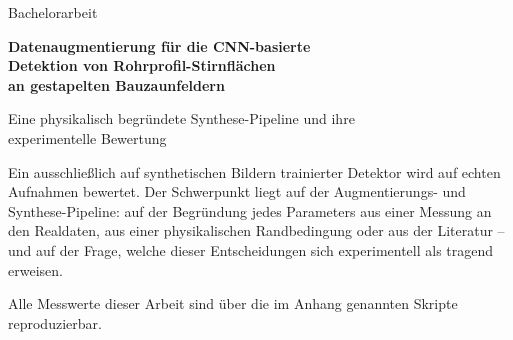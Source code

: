 \begin{titlepage}
\centering
\vspace*{2.5cm}

{\large Bachelorarbeit\par}
\vspace{1.6cm}

{\LARGE\bfseries Datenaugmentierung für die CNN-basierte\\[0.3em]
Detektion von Rohrprofil-Stirnflächen\\[0.3em]
an gestapelten Bauzaunfeldern\par}

\vspace{0.9cm}
{\large Eine physikalisch begründete Synthese-Pipeline und ihre\\
experimentelle Bewertung\par}

\vspace{2.6cm}
\begin{minipage}{0.8\textwidth}
\centering
\small
Ein ausschließlich auf synthetischen Bildern trainierter Detektor wird auf
echten Aufnahmen bewertet. Der Schwerpunkt liegt auf der Augmentierungs- und
Synthese-Pipeline: auf der Begründung jedes Parameters aus einer Messung an den
Realdaten, aus einer physikalischen Randbedingung oder aus der Literatur -- und
auf der Frage, welche dieser Entscheidungen sich experimentell als tragend
erweisen.
\end{minipage}

\vfill
{\small Alle Messwerte dieser Arbeit sind über die im Anhang genannten Skripte
reproduzierbar.\par}
\vspace{1cm}
\end{titlepage}
